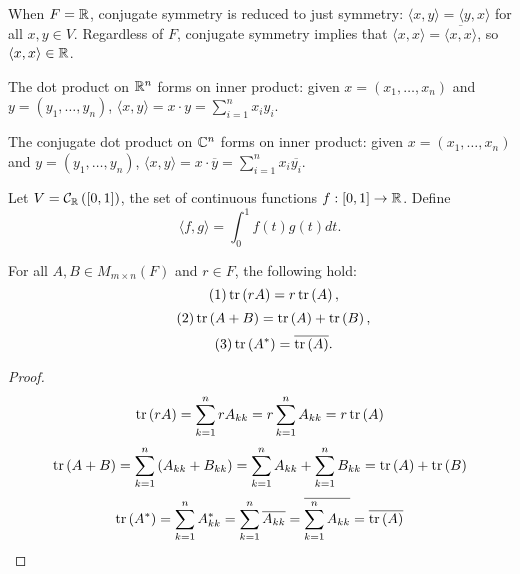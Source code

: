 \begin{rmk}
    When $F = \mathbb{R}$, conjugate symmetry is reduced to just symmetry: $\langle x, y\rangle = \langle y, x \rangle$ for all $x, y \in V$. Regardless of $F$, conjugate symmetry implies that $\langle x, x\rangle = \overline{\langle x, x\rangle}$, so $\langle x, x\rangle \in \mathbb{R}$.
\end{rmk}

\begin{exmp}
    The dot product on $\mathbb{R}^n$ forms on inner product: given $x = (x_1, \ldots, x_n)$ and $y = (y_1, \ldots, y_n)$, $\langle x, y\rangle = x \cdot y = \sum_{i=1}^{n}x_iy_i$.
\end{exmp}

\begin{exmp}
    The conjugate dot product on $\mathbb{C}^n$ forms on inner product: given $x = (x_1, \ldots, x_n)$ and $y = (y_1, \ldots, y_n)$, $\langle x, y\rangle = x \cdot \overline{y} = \sum_{i=1}^{n}x_i\overline{y_i}$.
\end{exmp}

\begin{exmp}
    Let $V = \mathcal{C}_{\mathbb{R}}\left([0, 1]\right)$, the set of continuous functions $f: [0, 1] \to \mathbb{R}$. Define
    \[\langle f, g \rangle = \int_0^1 f(t)g(t)dt.\]
\end{exmp}

\begin{lemma}\label{trace-properties}
    For all $A, B \in M_{m \times n}(F)$ and $r \in F$, the following hold:
    \begin{equation}\tag{1}\label{trace-homogeneous}
        \operatorname{tr}\left(rA\right) = r\operatorname{tr}\left(A\right),
    \end{equation}
    \begin{equation}\tag{2}\label{trace-additive}
        \operatorname{tr}\left(A + B\right) = \operatorname{tr}\left(A\right) + \operatorname{tr}\left(B\right),
    \end{equation}
    \begin{equation}\tag{3}\label{trace-conjugate-transpose}
        \operatorname{tr}\left(A^{*}\right) = \overline{\operatorname{tr}\left(A\right)}.
    \end{equation}
\end{lemma}

\begin{proof}
    \begin{equation*}
        \operatorname{tr}\left(rA\right) = \sum_{k=1}^{n}rA_{kk} = r\sum_{k=1}^{n}A_{kk} = r\operatorname{tr}\left(A\right)
    \end{equation*}
    \begin{equation*}
        \operatorname{tr}\left(A + B\right) = \sum_{k=1}^{n}\left(A_{kk} + B_{kk}\right) = \sum_{k=1}^{n}A_{kk} + \sum_{k=1}^{n}B_{kk} = \operatorname{tr}\left(A\right) + \operatorname{tr}\left(B\right)
    \end{equation*}
    \begin{equation*}
        \operatorname{tr}\left(A^{*}\right) = \sum_{k=1}^{n}A^{*}_{kk} = \sum_{k=1}^{n}\overline{A_{kk}} = \overline{\sum_{k=1}^{n}A_{kk}} = \overline{\operatorname{tr}\left(A\right)}
    \end{equation*}
\end{proof}

